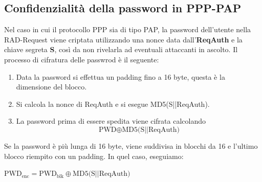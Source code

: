 \subsection{Confidenzialità della password in PPP-PAP}
Nel caso in cui il protocollo PPP sia di tipo PAP, la password dell'utente nella RAD-Request viene criptata utilizzando una nonce data dall'\textbf{ReqAuth} e la chiave segreta \textbf{S}, così da non rivelarla ad eventuali attaccanti in ascolto. Il processo di cifratura delle passwrod è il seguente: 
\begin{definition}
\begin{enumerate}
    \item Data la password si effettua un padding fino a 16 byte, questa è la dimensione del blocco.
    \item Si calcola la nonce di ReqAuth e si esegue MD5(S||ReqAuth). 
    \item La password prima di essere spedita viene cifrata calcolando 
    \[\text{PWD}\oplus\text{MD5(S||ReqAuth)}\]
\end{enumerate}
Se la password è più lunga di 16 byte, viene suddivisa in blocchi da 16 e l'ultimo blocco riempito con un padding. In quel caso, eseguiamo:
\begin{algorithmic}
\State $\text{PWD}_{\text{enc}}=\text{PWD}_{\text{blk}}\oplus\text{MD5(S||ReqAuth)}$
\EndFor
\end{algorithmic}
\end{definition}
\pagebreak
